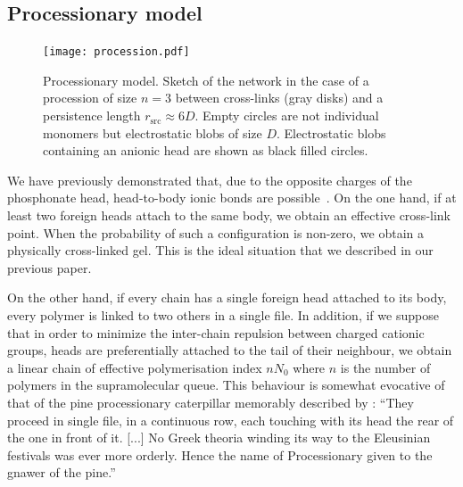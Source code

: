 \documentclass[journal=jacsat,manuscript=article]{achemso}
\begin{document}

\subsection{Processionary model}

\begin{figure}
\texttt{[image: procession.pdf]}
\caption{Processionary model. Sketch of the network in the case of a procession of size $n=3$ between cross-links (gray disks) and a persistence length $r_\mathrm{src}\approx 6D$. Empty circles are not individual monomers but electrostatic blobs of size $D$. Electrostatic blobs containing an anionic head are shown as black filled circles.}
\label{fig:dissociation}
\end{figure}

We have previously demonstrated that, due to the opposite charges of the phosphonate head, head-to-body ionic bonds are possible~\cite{Srour2014}. On the one hand, if at least two foreign heads attach to the same body, we obtain an effective cross-link point. When the probability of such a configuration is non-zero, we obtain a physically cross-linked gel. This is the ideal situation that we described in our previous paper.

On the other hand, if every chain has a single foreign head attached to its body, every polymer is linked to two others in a single file. In addition, if we suppose that in order to minimize the inter-chain repulsion between charged cationic groups, heads are preferentially attached to the tail of their neighbour, we obtain a linear chain of effective polymerisation index $n N_0$ where $n$ is the number of polymers in the supramolecular queue. This behaviour is somewhat evocative of that of the pine processionary caterpillar memorably described by \citet{Fabre1916}: 
``They proceed in single file, in a continuous row, each touching with its head the rear of the one in front of it. [...] No Greek theoria winding its way to the Eleusinian festivals was ever more orderly. Hence the name of Processionary given to the gnawer of the pine.''
\end{document}

